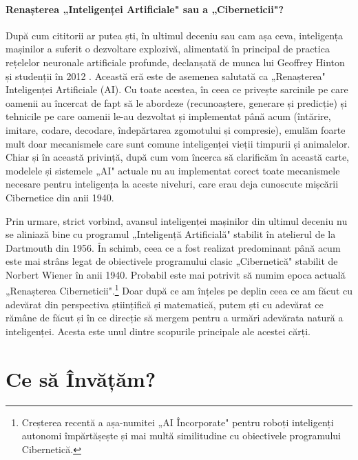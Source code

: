 \documentclass[../../book-main_ro.tex]{subfiles}
\begin{document}
\paragraph{Renașterea „Inteligenței Artificiale" sau a „Ciberneticii"?}
După cum cititorii ar putea ști, în ultimul deceniu sau cam așa ceva, inteligența mașinilor a suferit o dezvoltare explozivă, alimentată în principal de practica rețelelor neuronale artificiale profunde, declanșată de munca lui Geoffrey Hinton și studenții în 2012 \cite{krizhevsky2012imagenet}. Această eră este de asemenea salutată ca „Renașterea" Inteligenței Artificiale (AI). Cu toate acestea, în ceea ce privește sarcinile pe care oamenii au încercat de fapt să le abordeze (recunoaștere, generare și predicție) și tehnicile pe care oamenii le-au dezvoltat și implementat până acum (întărire, imitare, codare, decodare, îndepărtarea zgomotului și compresie), emulăm foarte mult doar mecanismele care sunt comune inteligenței vieții timpurii și animalelor. Chiar și în această privință, după cum vom încerca să clarificăm în această carte, modelele și sistemele „AI" actuale nu au implementat corect toate mecanismele necesare pentru inteligența la aceste niveluri, care erau deja cunoscute mișcării Cibernetice din anii 1940.

Prin urmare, strict vorbind, avansul inteligenței mașinilor din ultimul deceniu nu se aliniază bine cu programul „Inteligență Artificială" stabilit în atelierul de la Dartmouth din 1956. În schimb, ceea ce a fost realizat predominant până acum este mai strâns legat de obiectivele programului clasic „Cibernetică" stabilit de Norbert Wiener în anii 1940. Probabil este mai potrivit să numim epoca actuală „Renașterea Ciberneticii".\footnote{Creșterea recentă a așa-numitei „AI Încorporate" pentru roboți inteligenți autonomi împărtășește și mai multă similitudine cu obiectivele programului Cibernetică.} Doar după ce am înțeles pe deplin ceea ce am făcut cu adevărat din perspectiva științifică și matematică, putem ști cu adevărat ce rămâne de făcut și în ce direcție să mergem pentru a urmări adevărata natură a inteligenței. Acesta este unul dintre scopurile principale ale acestei cărți.


\section{Ce să Învățăm?}
\label{sec:what-to-learn}
\end{document}
